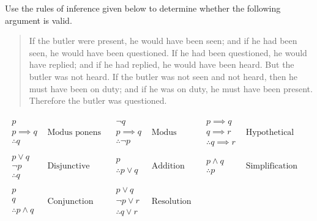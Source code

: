 \documentclass[addpoints]{exam}
\begin{document}
\begin{questions}
  \question  [10] Use the rules of inference given below to determine whether the following argument is valid.
  \begin{quotation}
If the butler were present, he would have been seen; and if he had been seen, he would have been questioned. If he had been questioned, he would have replied; and if he had replied, he would have been heard. But the butler was not heard. If the butler was not seen and not heard, then he must have been on duty; and if he was on duty, he must have been present. Therefore the butler was questioned.
  \end{quotation}
  \[
    \begin{array}{cc||cc||cc}
      \begin{array}{l}
        p\\p\implies q\\\hline\therefore q
      \end{array}
      &
        \text{Modus ponens}& 
      \begin{array}{l}
        \neg q\\p\implies q\\\hline\therefore \neg p
      \end{array}
      &
        \text{Modus tollens}& 
      \begin{array}{l}
        p\implies q\\q\implies r\\\hline\therefore q\implies r
      \end{array}
      &
        \text{Hypothetical syllogism}\\
      \hline\hline
      \begin{array}{l}
        p\lor q\\\neg p\\\hline\therefore q
      \end{array}
      &
        \text{Disjunctive syllogism}&
      \begin{array}{l}
        p\\\hline\therefore p\lor q
      \end{array}
      &
        \text{Addition}& 
      \begin{array}{l}
        p\land q\\\hline\therefore p
      \end{array}
      &
        \text{Simplification}\\
      \hline\hline
      \begin{array}{l}
        p\\ q\\\hline\therefore p\land q
      \end{array}
      &
        \text{Conjunction}& 
      \begin{array}{l}
        p\lor q\\ \neg p\lor r\\\hline\therefore q\lor r
      \end{array}
      &
        \text{Resolution} 
    \end{array}
  \]
  

\end{questions}
\end{document}
